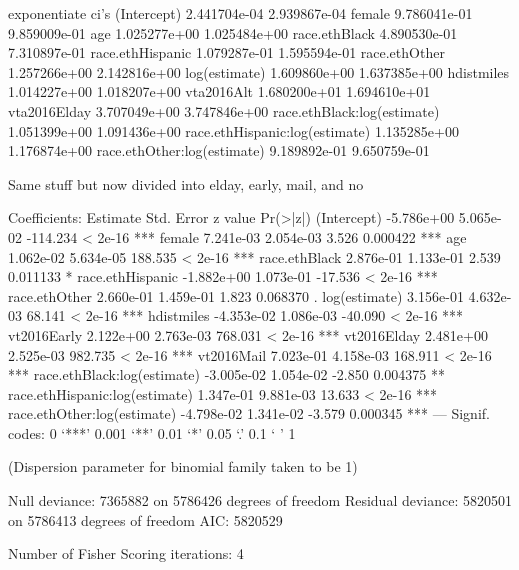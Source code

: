 exponentiate ci's
(Intercept)                    2.441704e-04 2.939867e-04
female                         9.786041e-01 9.859009e-01
age                            1.025277e+00 1.025484e+00
race.ethBlack                  4.890530e-01 7.310897e-01
race.ethHispanic               1.079287e-01 1.595594e-01
race.ethOther                  1.257266e+00 2.142816e+00
log(estimate)                  1.609860e+00 1.637385e+00
hdistmiles                     1.014227e+00 1.018207e+00
vta2016Alt                     1.680200e+01 1.694610e+01
vta2016Elday                   3.707049e+00 3.747846e+00
race.ethBlack:log(estimate)    1.051399e+00 1.091436e+00
race.ethHispanic:log(estimate) 1.135285e+00 1.176874e+00
race.ethOther:log(estimate)    9.189892e-01 9.650759e-01



Same stuff but now divided into elday, early, mail, and no


Coefficients:
                                 Estimate Std. Error  z value Pr(>|z|)
(Intercept)                    -5.786e+00  5.065e-02 -114.234  < 2e-16 ***
female                          7.241e-03  2.054e-03    3.526 0.000422 ***
age                             1.062e-02  5.634e-05  188.535  < 2e-16 ***
race.ethBlack                   2.876e-01  1.133e-01    2.539 0.011133 *
race.ethHispanic               -1.882e+00  1.073e-01  -17.536  < 2e-16 ***
race.ethOther                   2.660e-01  1.459e-01    1.823 0.068370 .
log(estimate)                   3.156e-01  4.632e-03   68.141  < 2e-16 ***
hdistmiles                     -4.353e-02  1.086e-03  -40.090  < 2e-16 ***
vt2016Early                     2.122e+00  2.763e-03  768.031  < 2e-16 ***
vt2016Elday                     2.481e+00  2.525e-03  982.735  < 2e-16 ***
vt2016Mail                      7.023e-01  4.158e-03  168.911  < 2e-16 ***
race.ethBlack:log(estimate)    -3.005e-02  1.054e-02   -2.850 0.004375 **
race.ethHispanic:log(estimate)  1.347e-01  9.881e-03   13.633  < 2e-16 ***
race.ethOther:log(estimate)    -4.798e-02  1.341e-02   -3.579 0.000345 ***
---
Signif. codes:  0 ‘***’ 0.001 ‘**’ 0.01 ‘*’ 0.05 ‘.’ 0.1 ‘ ’ 1

(Dispersion parameter for binomial family taken to be 1)

    Null deviance: 7365882  on 5786426  degrees of freedom
Residual deviance: 5820501  on 5786413  degrees of freedom
AIC: 5820529

Number of Fisher Scoring iterations: 4


